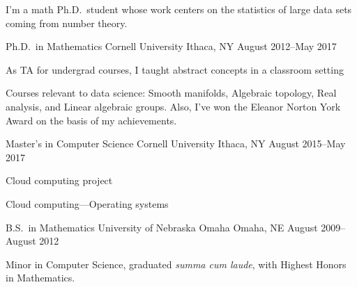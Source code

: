 \documentclass[11pt, letterpaper]{awesome-cv}
\begin{document}
\makecvheader





\begin{cvparagraph}

I'm a math Ph.D.~student whose work centers on the statistics of large data sets coming from number theory. 
\end{cvparagraph}






\begin{cventries}

\cventry
	{Ph.D.~in Mathematics}
	{Cornell University}
	{Ithaca, NY}
	{August 2012--May 2017}
	{
		\begin{cvitems}
			\item{As TA for undergrad courses, I taught abstract concepts in a classroom setting}
			\item{Courses relevant to data science: Smooth manifolds, Algebraic topology, Real analysis, and Linear algebraic groups. Also, I've won the Eleanor Norton York Award on the basis of my achievements.}
		\end{cvitems}
	}
	
\cventry
	{Master's in Computer Science}
	{Cornell University}
	{Ithaca, NY}
	{August 2015--May 2017}
	{
		\begin{cvitems}
			\item{Cloud computing project}
			\item{Cloud computing---Operating systems}
		\end{cvitems}
	}
	
\cventry
	{B.S.~in Mathematics}
	{University of Nebraska Omaha}
	{Omaha, NE}
	{August 2009--August 2012}
	{
		\begin{cvitems}
			\item{Minor in Computer Science, graduated \emph{summa cum laude}, with Highest Honors in Mathematics.}
		\end{cvitems}
	}
	
\end{cventries}










\end{document}
